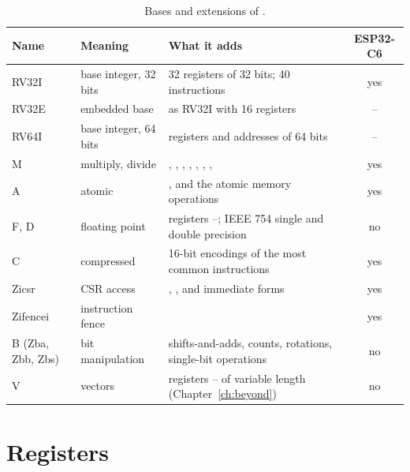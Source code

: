 \begin{table}[htb]
\centering\small
\caption{Bases and extensions of \riscv.}\label{tab:rv:ext}
\begin{tabularx}{\textwidth}{@{}llLc@{}}
\toprule
\textbf{Name} & \textbf{Meaning} & \textbf{What it adds} & \textbf{ESP32-C6}\\
\midrule
RV32I & base integer, 32 bits & 32 registers of 32 bits; 40 instructions & yes\\
RV32E & embedded base & as RV32I with 16 registers & --\\
RV64I & base integer, 64 bits & registers and addresses of 64 bits & --\\
M & multiply, divide & , , , , , , ,  & yes\\
A & atomic & ,  and the atomic memory operations & yes\\
F, D & floating point & registers --; IEEE 754 single and double precision & no\\
C & compressed & 16-bit encodings of the most common instructions & yes\\
Zicsr & CSR access & , ,  and immediate forms & yes\\
Zifencei & instruction fence &  & yes\\
B (Zba, Zbb, Zbs) & bit manipulation & shifts-and-adds, counts, rotations, single-bit operations & no\\
V & vectors & registers -- of variable length (Chapter~\ref{ch:beyond}) & no\\
\bottomrule
\end{tabularx}
\end{table}

\section{Registers}

